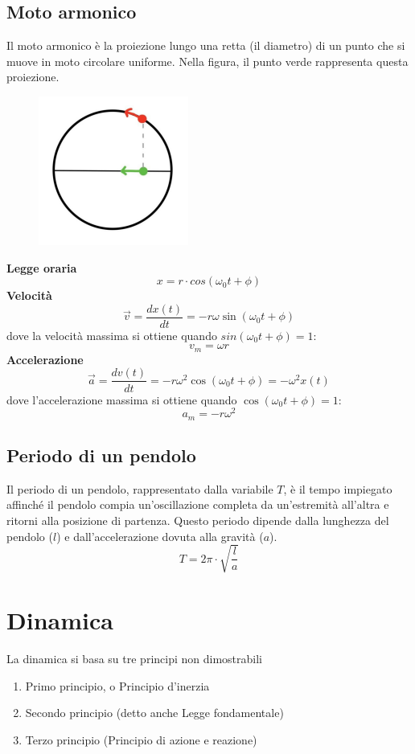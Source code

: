\documentclass{article}
\begin{document}
\subsection{Moto armonico}
Il moto armonico è la proiezione lungo una retta (il diametro) di un punto che si muove in moto circolare uniforme. Nella figura, il punto verde rappresenta questa proiezione.
\begin{figure}[ht]
    \centering
    \includegraphics[width=0.3\linewidth]{Immagini/armonico.png}
\end{figure}

\noindent \textbf{Legge oraria}
\[
    x = r \cdot cos(\omega_0t + \phi)
\]
\noindent\textbf{Velocità}
\[
\Vec{v}= \frac{dx(t)}{dt} = -r \omega \sin(\omega_0t + \phi)    
\]
dove la velocità massima si ottiene quando \(sin(\omega_0t + \phi) = 1\):
\[
v_m = \omega r 
\]
\noindent\textbf{Accelerazione}
\[
\Vec{a} = \frac{dv(t)}{dt} = -r\omega^2 \cos(\omega_0t + \phi) = -\omega^2 x(t)
\]
dove l'accelerazione massima si ottiene quando \( \cos(\omega_0t + \phi) = 1\):
\[
a_m = -r\omega^2
\]
\subsection{Periodo di un pendolo}
Il periodo di un pendolo, rappresentato dalla variabile \( T \), è il tempo impiegato affinché il pendolo compia un'oscillazione completa da un'estremità all'altra e ritorni alla posizione di partenza. Questo periodo dipende dalla lunghezza del pendolo (\( l \)) e dall'accelerazione dovuta alla gravità (\( a \)).
\[
    T = 2\pi \cdot \sqrt{\frac{l}{a}}
\]
\newpage







\section{Dinamica}
La dinamica si basa su tre principi non dimostrabili
\begin{enumerate}
    \item Primo principio, o Principio d'inerzia
    \item Secondo principio (detto anche Legge fondamentale)
    \item Terzo principio (Principio di azione e reazione)
\end{enumerate}
\end{document}
